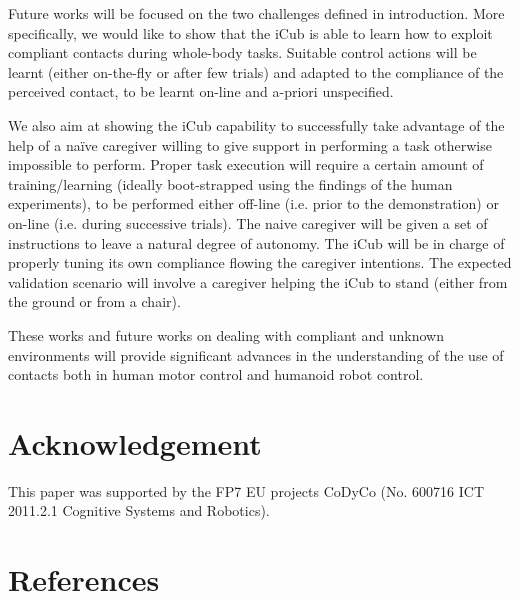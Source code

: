 \documentclass[final,5p,twocolumn]{elsarticle}
\begin{document}
Future works will be focused on the two challenges defined in introduction. More specifically, we would like to show that the iCub is able to learn how to exploit compliant contacts during whole-body tasks. Suitable control actions will be learnt (either on-the-fly or after few trials) and adapted to the compliance of the perceived contact, to be learnt on-line and a-priori unspecified. 

We also aim at showing the iCub capability to successfully take advantage of the help of a naïve caregiver willing to give support in performing a task otherwise impossible to perform. Proper task execution will require a certain amount of training/learning (ideally boot-strapped using the findings of the human experiments), to be performed either off-line (i.e. prior to the demonstration) or on-line (i.e. during successive trials). The naive caregiver will be given a set of instructions to leave a natural degree of autonomy. The iCub will be in charge of properly tuning its own compliance flowing the caregiver intentions. The expected validation scenario will involve a caregiver helping the iCub to stand (either from the ground or from a chair).

These works and future works on dealing with compliant and unknown environments will provide significant advances in the understanding of the use of contacts both in human motor control and humanoid robot control.



\section{Acknowledgement}
This paper was supported by the FP7 EU projects CoDyCo (No. 600716 ICT 2011.2.1 Cognitive Systems and Robotics).

\section{References}


\end{document}
